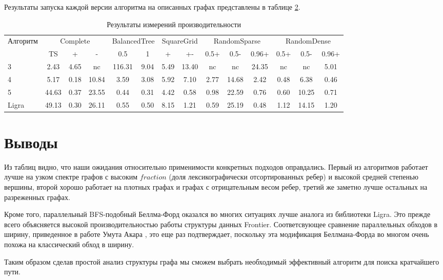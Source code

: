 \begin{table}[H]
\begin{tabular}{c | c | c | l}
\end{tabular}

\label{bf_algo_comparison}
\end{table}
\FloatBarrier
Результаты запуска каждой версии алгоритма на описанных графах представлены в таблице \ref{graph_description}.
\begin{table}[H]
\centering
\caption{Результаты измерений производительности}
\begin{tabular}{l|ccc|cc|cc|ccc|ccc}  
\hline
Алгоритм & \multicolumn{3}{c}{Complete} & \multicolumn{2}{c}{BalancedTree} & \multicolumn{2}{c}{SquareGrid} & \multicolumn{3}{c}{RandomSparse} & \multicolumn{3}{c}{RandomDense}\\
& TS & + & - & 0.5 & 1 & + & +- & 0.5+  & 0.5- & 0.96+ & 0.5+ & 0.5- & 0.96+\\
\hline\hline
3 & 2.43 & 4.65 & nc & 116.31 & 9.04 & 5.49 & 13.40 & nc & nc & 24.35 & nc & nc & 5.01 \\  
4 & 5.17 & 0.18 & 10.84 & 3.59 & 3.08 & 5.92 & 7.10 & 2.77 & 14.68 & 2.42 & 0.48  & 6.38  & 0.46 \\
5 & 44.63 & 0.37 & 23.55 & 0.44 & 0.31 & 4.42 & 0.58 & 0.98 & 22.59 & 0.76  & 0.60  & 10.25 & 0.71 \\
Ligra & 49.13 & 0.30 & 26.11 & 0.55 & 0.50 & 8.15 & 1.21 & 0.59 & 25.19 & 0.48  & 1.12  & 14.15 & 1.20 \\
\hline
\end{tabular}

\label{graph_description}
\end{table}

\FloatBarrier
\section{Выводы}

Из таблиц видно, что наши ожидания относительно применимости конкретных подходов оправдались. Первый из алгоритмов работает лучше на узком спектре графов с высоким $fraction$ (доля лексикографически отсортированных ребер) и высокой средней степенью вершины, второй хорошо работает на плотных графах и графах с отрицательным весом ребер, третий же заметно лучше остальных на разреженных графах.

Кроме того, параллельный BFS-подобный Беллма-Форд оказался во многих ситуациях лучше аналога из библиотеки Ligra. Это прежде всего объясняется высокой производительностью работы структуры данных Frontier. Соответсвующее сравнение параллельных обходов в ширину, приведенное в работе Умута Акара \cite{FRONTIERSEARCH}, это еще раз подтверждает, поскольку эта модификация Беллмана-Форда во многом очень похожа на классический обход в ширину. 

Таким образом сделав простой анализ структуры графа мы сможем выбрать необходимый эффективный алгоритм для поиска кратчайшего пути. 
\FloatBarrier

